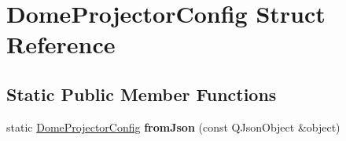 \hypertarget{struct_dome_projector_config}{}\section{Dome\+Projector\+Config Struct Reference}
\label{struct_dome_projector_config}
\subsection*{Static Public Member Functions}
\begin{DoxyCompactItemize}
\item 
\mbox{\label{struct_dome_projector_config_a7bf2620a0e55675ce701d53b6e64b358}} 
static \mbox{\hyperlink{struct_dome_projector_config}{Dome\+Projector\+Config}} {\bfseries from\+Json} (const Q\+Json\+Object \&object)
\end{DoxyCompactItemize}
